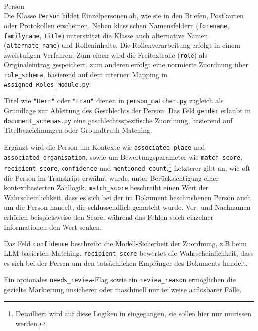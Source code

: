 \documentclass[12pt, a4paper, ngerman, bidi=default]{article}
\makeatletter
\newcommand{\code}[1]{\colorbox{VeryLightGray}{\texttt{#1}}} %
\let\oldparagraph\paragraph%
\renewcommand{\paragraph}{
    \@ifstar%
      \xxxParagraphStar%
      \xxxParagraphNoStar%
 }
\newcommand{\xxxParagraphStar}[1]{\oldparagraph*{#1}\mbox{}}
\newcommand{\xxxParagraphNoStar}[1]{\oldparagraph{#1}\mbox{}}
\makeatother
\begin{document}
\paragraph{Person}\\
Die Klasse \code{Person} bildet Einzelpersonen ab, wie sie in den Briefen, Postkarten oder Protokollen erscheinen. 
Neben klassischen Namensfeldern (\code{forename}, \code{familyname}, \code{title}) unterstützt die Klasse auch 
alternative Namen (\code{alternate\_name}) und Rolleninhalte. Die Rollenverarbeitung erfolgt in einem zweistufigen Verfahren:
Zum einen wird die Freitextrolle (\code{role}) als Originaleintrag gespeichert, zum anderen erfolgt eine normierte 
Zuordnung über \code{role\_schema}, basierend auf dem internen Mapping in \code{Assigned\_Roles\_Module.py}. 

Titel wie \code{"Herr"} oder \code{"Frau"} dienen in \code{person\_matcher.py} zugleich als Grundlage zur 
Ableitung des Geschlechts der Person. Das Feld \code{gender} erlaubt in \code{document\_schemas.py} eine 
geschlechtsspezifische Zuordnung, basierend auf Titelbezeichnungen oder Groundtruth-Matching. 

Ergänzt wird die Person um Kontexte wie \code{associated\_place} und \code{associated\_organisation}, sowie um Bewertungsparameter 
wie \code{match\_score}, \code{recipient\_score}, \code{confidence} und \code{mentioned\_count}.\footnote{Detailliert wird auf diese Logiken in 
 eingegangen, sie sollen hier nur umrissen werden.} 
Letzterer gibt an, wie oft 
die Person im Transkript erwähnt wurde, unter Berücksichtigung einer kontextbasierten Zähllogik.
\code{match\_score} beschreibt einen Wert der Wahrscheinlichkeit, dass es sich bei der im Dokument beschriebenen Person auch 
um die Person handelt, die schlussendlich gematcht wurde. Vor- und Nachnamen erhöhen beispielsweise den Score, während das
Fehlen solch einzelner Informationen den Wert senken. 

Das Feld \code{confidence} beschreibt die Modell-Sicherheit der Zuordnung, z.B.beim LLM-basierten Matching. 
\code{recipient\_score} bewertet die Wahrscheinlichkeit, dass es sich bei der Person um den tatsächlichen Empfänger des Dokuments handelt. 

Ein optionales \code{needs\_review}-Flag sowie ein \code{review\_reason} ermöglichen die gezielte Markierung unsicherer oder 
maschinell nur teilweise auflösbarer Fälle.
\end{document}

